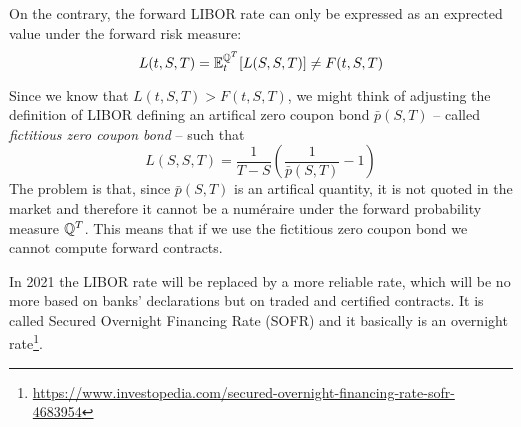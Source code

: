 On the contrary, the forward LIBOR rate can only be expressed as an exprected value under the forward risk measure:
\begin{equation}
    L(t,S,T) = \mathbb{E}^{\mathbb{Q}^T}_t[L(S,S,T)] \ne F(t,S,T)
\end{equation}
\begin{remark}
    Since we know that $L(t,S,T) > F(t,S,T)$, we might think of adjusting the definition of LIBOR defining an artifical zero coupon bond $\bar{p}(S,T)$ -- called \emph{fictitious zero coupon bond} -- such that
    \begin{equation*}
        L(S,S,T) = \frac{1}{T-S}\left(\frac{1}{\bar{p}(S,T)}-1\right)
    \end{equation*}
    The problem is that, since $\bar{p}(S,T)$ is an artifical quantity, it is not quoted in the market and therefore it cannot be a numéraire under the forward probability measure $\mathbb{Q}^T$. This means that if we use the fictitious zero coupon bond we cannot compute forward contracts.
\end{remark}
\begin{remark}
    In 2021 the LIBOR rate will be replaced by a more reliable rate, which will be no more based on banks' declarations but on traded and certified contracts. It is called Secured Overnight Financing Rate (SOFR) and it basically is an overnight rate\footnote{\url{https://www.investopedia.com/secured-overnight-financing-rate-sofr-4683954}}.
\end{remark}
